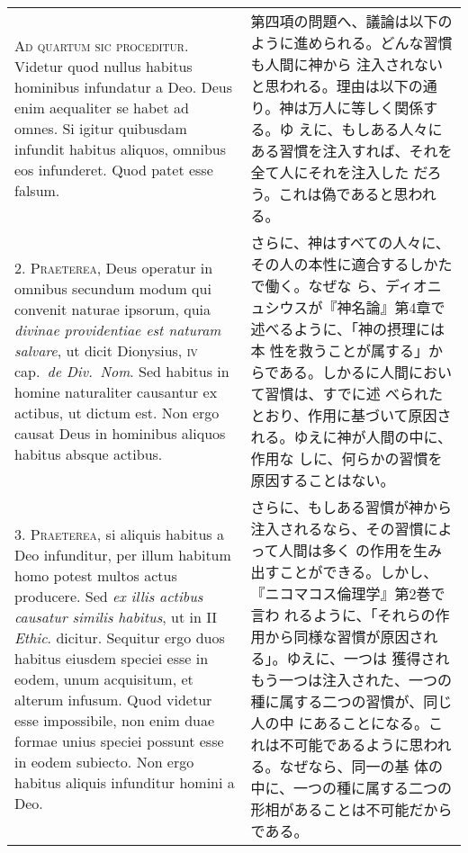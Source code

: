 \documentclass[10pt]{jsarticle} %
\begin{document}
\begin{longtable}{p{21em}p{21em}}

{\scshape Ad quartum sic proceditur}. Videtur quod nullus habitus
hominibus infundatur a Deo. Deus enim aequaliter se habet ad omnes. Si
igitur quibusdam infundit habitus aliquos, omnibus eos
infunderet. Quod patet esse falsum.

&

第四項の問題へ、議論は以下のように進められる。どんな習慣も人間に神から
注入されないと思われる。理由は以下の通り。神は万人に等しく関係する。ゆ
えに、もしある人々にある習慣を注入すれば、それを全て人にそれを注入した
だろう。これは偽であると思われる。

\\

2. {\scshape Praeterea}, Deus operatur in omnibus secundum modum qui
convenit naturae ipsorum, quia {\itshape divinae providentiae est
naturam salvare}, ut dicit Dionysius, {\scshape iv} cap.~{\itshape de
Div.~Nom}. Sed habitus in homine naturaliter causantur ex actibus, ut
dictum est. Non ergo causat Deus in hominibus aliquos habitus absque
actibus.

&

さらに、神はすべての人々に、その人の本性に適合するしかたで働く。なぜな
ら、ディオニュシウスが『神名論』第4章で述べるように、「神の摂理には本
性を救うことが属する」からである。しかるに人間において習慣は、すでに述
べられたとおり、作用に基づいて原因される。ゆえに神が人間の中に、作用な
しに、何らかの習慣を原因することはない。

\\



3. {\scshape Praeterea}, si aliquis habitus a Deo infunditur, per
illum habitum homo potest multos actus producere. Sed {\itshape ex
illis actibus causatur similis habitus}, ut in II {\itshape
Ethic}. dicitur. Sequitur ergo duos habitus eiusdem speciei esse in
eodem, unum acquisitum, et alterum infusum. Quod videtur esse
impossibile, non enim duae formae unius speciei possunt esse in eodem
subiecto. Non ergo habitus aliquis infunditur homini a Deo.

&

さらに、もしある習慣が神から注入されるなら、その習慣によって人間は多く
の作用を生み出すことができる。しかし、『ニコマコス倫理学』第2巻で言わ
れるように、「それらの作用から同様な習慣が原因される」。ゆえに、一つは
獲得されもう一つは注入された、一つの種に属する二つの習慣が、同じ人の中
にあることになる。これは不可能であるように思われる。なぜなら、同一の基
体の中に、一つの種に属する二つの形相があることは不可能だからである。


\end{longtable}
\end{document}
